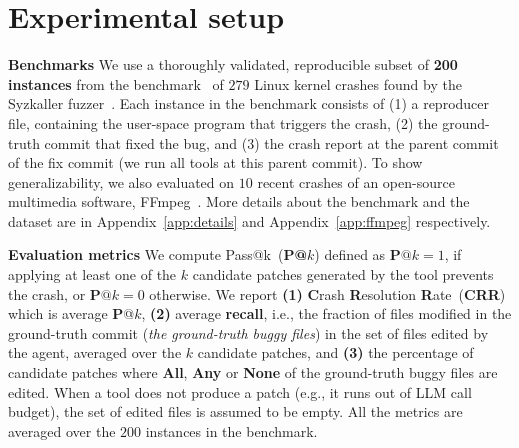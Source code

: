 \section{Experimental setup}%
\label{sec:experiments}

\noindent\textbf{Benchmarks} We use a thoroughly validated, reproducible subset of \textbf{200 instances} from the \kbenchsyz{} benchmark~\citep{kgym} of $279$ Linux kernel crashes found by the Syzkaller fuzzer~\citep{syzkaller}.
Each instance in the benchmark consists of (1) a reproducer file, containing the user-space program that triggers the crash, (2) the ground-truth commit that fixed the bug, 
and (3) the crash report at the parent commit of the fix commit (we run all tools at this parent commit).
To show generalizability, we also evaluated \cresearcher{} on $10$ recent crashes of an open-source multimedia software, FFmpeg~\citep{ffmpeg}.
More details about the \kbenchsyz{} benchmark and the \ffmpeg{} dataset are in Appendix~\ref{app:details} and Appendix~\ref{app:ffmpeg} respectively.

\noindent\textbf{Evaluation metrics}
We compute Pass@k~(\textbf{P@$k$}) defined as $\textbf{P@$k$} = 1$, if applying at least one of the $k$ candidate patches generated by the tool prevents the crash, 
or $\textbf{P@$k$} = 0$ otherwise. We report \textbf{(1)} \textbf{C}rash \textbf{R}esolution \textbf{R}ate~(\textbf{CRR}) which is average \textbf{P}@$k$, \textbf{(2)} average \textbf{recall}, i.e., the fraction of files modified in the ground-truth commit (\emph{the ground-truth buggy files}) in the set of files edited by the agent, averaged over the $k$ candidate patches, and 
\textbf{(3)} the percentage of candidate patches where \textbf{All}, \textbf{Any} or \textbf{None} of the ground-truth buggy files are edited. 
When a tool does not produce a patch (e.g., it runs out of LLM call budget), the set of edited files is assumed to be empty. All the metrics are averaged over the $200$ instances in the benchmark. 

